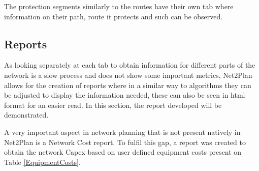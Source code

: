 	
	
	
	The protection segments similarly to the routes have their own tab where information on their path, route it protects and such can be observed.

\newpage
	
	\subsection{Reports} \label{Reports}
	As looking separately at each tab to obtain information for different parts of the network is a slow process and does not show some important metrics, Net2Plan allows for the creation of reports where in a similar way to algorithms they can be adjusted to display the information needed, these can also be seen in html format for an easier read. In this section, the report developed will be demonstrated.
	
	
	A very important aspect in network planning that is not present natively in Net2Plan is a Network Cost report. To fulfil this gap, a report was created to obtain the network Capex based on user defined equipment costs present on Table \ref{EquipmentCosts}.
		
